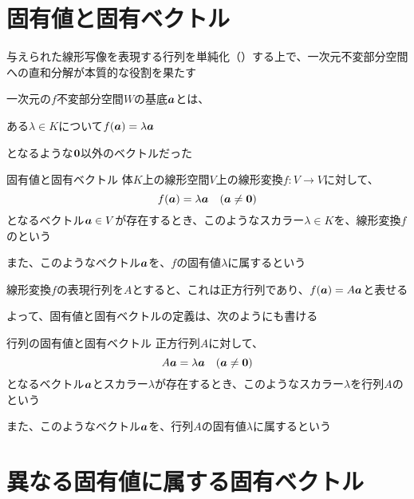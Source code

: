 \documentclass[../../../topic_linear-algebra]{subfiles}
\begin{document}
\sectionline
\section{固有値と固有ベクトル}

与えられた線形写像を表現する行列を単純化（）する上で、一次元不変部分空間への直和分解が本質的な役割を果たす

\br

一次元の$f$不変部分空間$W$の基底$\vb*{a}$とは、
\begin{shaded}
  ある$\lambda \in K$について$f(\vb*{a}) = \lambda \vb*{a}$
\end{shaded}
となるような$\vb*{0}$以外のベクトルだった

\begin{definition*}{固有値と固有ベクトル}
  体$K$上の線形空間$V$上の線形変換$f\colon V \to V$に対して、
  \begin{equation*}
    f(\vb*{a}) = \lambda \vb*{a} \quad (\vb*{a} \neq \vb*{0})
  \end{equation*}
  となるベクトル$\vb*{a} \in V$が存在するとき、このようなスカラー$\lambda \in K$を、線形変換$f$のという

  また、このようなベクトル$\vb*{a}$を、$f$の固有値$\lambda$に属するという
\end{definition*}

線形変換$f$の表現行列を$A$とすると、これは正方行列であり、$f(\vb*{a}) = A\vb*{a}$と表せる

よって、固有値と固有ベクトルの定義は、次のようにも書ける

\begin{definition*}{行列の固有値と固有ベクトル}
  正方行列$A$に対して、
  \begin{equation*}
    A\vb*{a} = \lambda \vb*{a} \quad (\vb*{a} \neq \vb*{0})
  \end{equation*}
  となるベクトル$\vb*{a}$とスカラー$\lambda$が存在するとき、このようなスカラー$\lambda$を行列$A$のという

  また、このようなベクトル$\vb*{a}$を、行列$A$の固有値$\lambda$に属するという
\end{definition*}

\sectionline
\section{異なる固有値に属する固有ベクトル}
\end{document}
